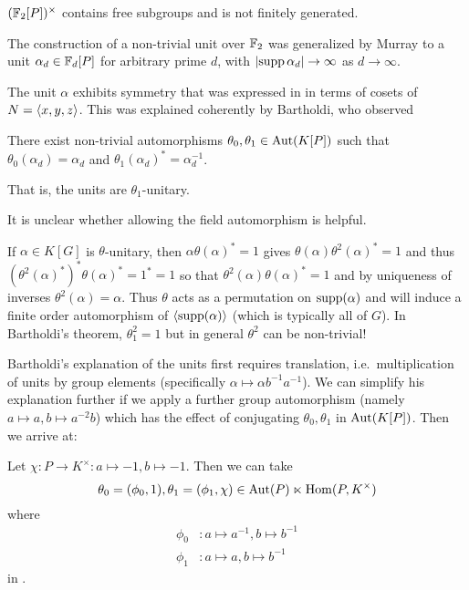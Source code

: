 \begin{corollary}
    \label{corollary:huge_group_of_units}
    $(\mathbb{F}_2[P])^\times$ contains free subgroups and is not finitely generated.
\end{corollary}

The construction of a non-trivial unit over $\mathbb{F}_2$ was generalized by Murray \cite{Murray21} to a unit $\alpha_d \in \mathbb{F}_d[P]$ for arbitrary prime $d$, with $\lvert \operatorname{supp}{\alpha_d} \rvert \to \infty$ as $d \to \infty$.

The unit $\alpha$ exhibits symmetry that was expressed in \cite{Gardam21} in terms of cosets of $N = \langle x, y, z \rangle$.
This was explained coherently by Bartholdi, who observed
\begin{theorem}
    \label{theorem:bartholdi_unit_symmetry}
    There exist non-trivial automorphisms $\theta_0, \theta_1 \in \mathrm{Aut}(K[P])$ such that $\theta_0(\alpha_d) = \alpha_d$ and $\theta_1(\alpha_d)^* = \alpha_d^{-1}$.
\end{theorem}
That is, the units are $\theta_1$-unitary.

\begin{remark}
    It is unclear whether allowing the field automorphism is helpful.
\end{remark}

\begin{remark}
    If $\alpha \in K[G]$ is $\theta$-unitary, then $\alpha \theta(\alpha)^* = 1$ gives $\theta(\alpha) \theta^2(\alpha)^* = 1$ and thus $(\theta^2(\alpha)^*)^* \theta(\alpha)^* = 1^* = 1$ so that $\theta^2(\alpha) \theta(\alpha)^* = 1$ and by uniqueness of inverses $\theta^2(\alpha) = \alpha$.
    Thus $\theta$ acts as a permutation on $\operatorname{supp}(\alpha)$ and will induce a finite order automorphism of $\langle \operatorname{supp}(\alpha) \rangle$ (which is typically all of $G$).
    In Bartholdi's theorem, $\theta_1^2 = 1$ but in general $\theta^2$ can be non-trivial!
\end{remark}

Bartholdi's explanation of the units first requires translation, i.e.\ multiplication of units by group elements (specifically $\alpha \mapsto \alpha b^{-1} a^{-1}$).
We can simplify his explanation further if we apply a further group automorphism (namely $a \mapsto a, b \mapsto a^{-2} b$) which has the effect of conjugating $\theta_0, \theta_1$ in $\mathrm{Aut}(K[P])$.
Then we arrive at:

\begin{proposition}
    Let $\chi \colon P \to K^\times \colon a \mapsto -1, b \mapsto -1$.
    Then we can take \[
        \theta_0 = (\phi_0, 1), \theta_1 = (\phi_1, \chi) \in \mathrm{Aut}(P) \ltimes \mathrm{Hom}(P, K^\times)
    \] where
    \begin{align*}
        \phi_0 &\colon a \mapsto a^{-1}, b \mapsto b^{-1} \\
        \phi_1 &\colon a \mapsto a, b \mapsto b^{-1}
    \end{align*}
    in .
\end{proposition}


